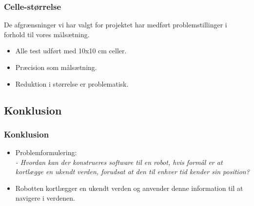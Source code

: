 \begin{frame}
\frametitle{Celle-størrelse}
De afgrænsninger vi har valgt for projektet har medført problemstillinger i forhold til vores målsætning.
\begin{itemize}
\item Alle test udført med 10x10 cm celler.
\item Præcision som målsætning.
\item Reduktion i størrelse er problematisk.
\end{itemize}
\end{frame}

\subsection{Konklusion}

\begin{frame}
\frametitle{Konklusion}
\begin{itemize}
\item Problemformulering:\\
\textit{- Hvordan kan der konstrueres software til en robot, hvis formål er at kortlægge en ukendt verden, forudsat at den til enhver tid kender sin position?}
\pause
\item Robotten kortlægger en ukendt verden og anvender denne information til at navigere i verdenen.
\end{itemize}
\end{frame}